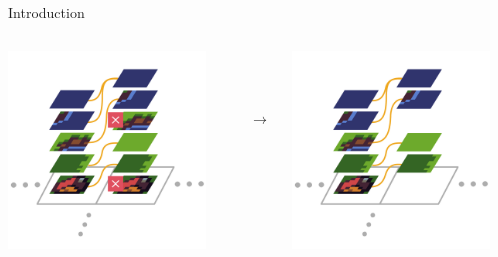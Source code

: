 \documentclass{beamer}
\begin{document}
\begin{frame}[fragile]{Introduction}
    \begin{columns}[T,onlytextwidth]
        \begin{block}{}
          \includegraphics[width=0.9\textwidth]{figs/ac_illustration_inconsistent.pdf}
        \end{block}
        \begin{block}{}
          \begin{centering}
          \hfill \\
          \hfill \\
          \hfill \\
            $\boldsymbol{\to}$
          \end{centering}
        \end{block}
        \begin{block}{}
          \includegraphics[width=0.9\textwidth]{figs/ac_illustration_consistent.pdf}

\end{block}
\end{columns}
\end{frame}
\end{document}
